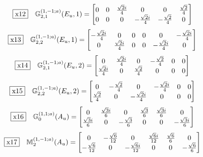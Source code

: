 \documentclass[fleqn,10pt,landscape]{jsarticle}
\begin{document}
\begin{dmath*}
\fbox{x12}\quad \mathbb{G}_{2,1}^{(1,-1;a)}(E_{u},1)=\begin{bmatrix} 0 & 0 & \frac{\sqrt{2} i}{4} & 0 & 0 & \frac{\sqrt{2}}{4} \\ 0 & 0 & 0 & - \frac{\sqrt{2} i}{4} & - \frac{\sqrt{2}}{4} & 0 \end{bmatrix}
\end{dmath*}
\begin{dmath*}
\fbox{x13}\quad \mathbb{G}_{2,2}^{(1,-1;a)}(E_{u},1)=\begin{bmatrix} - \frac{\sqrt{2} i}{4} & 0 & 0 & 0 & 0 & - \frac{\sqrt{2} i}{4} \\ 0 & \frac{\sqrt{2} i}{4} & 0 & 0 & - \frac{\sqrt{2} i}{4} & 0 \end{bmatrix}
\end{dmath*}
\begin{dmath*}
\fbox{x14}\quad \mathbb{G}_{2,1}^{(1,-1;a)}(E_{u},2)=\begin{bmatrix} 0 & \frac{\sqrt{2} i}{4} & 0 & - \frac{\sqrt{2}}{4} & 0 & 0 \\ \frac{\sqrt{2} i}{4} & 0 & \frac{\sqrt{2}}{4} & 0 & 0 & 0 \end{bmatrix}
\end{dmath*}
\begin{dmath*}
\fbox{x15}\quad \mathbb{G}_{2,2}^{(1,-1;a)}(E_{u},2)=\begin{bmatrix} 0 & - \frac{\sqrt{2}}{4} & 0 & - \frac{\sqrt{2} i}{4} & 0 & 0 \\ \frac{\sqrt{2}}{4} & 0 & - \frac{\sqrt{2} i}{4} & 0 & 0 & 0 \end{bmatrix}
\end{dmath*}
\begin{dmath*}
\fbox{x16}\quad \mathbb{G}_{0}^{(1,1;a)}(A_{u})=\begin{bmatrix} 0 & \frac{\sqrt{3} i}{6} & 0 & \frac{\sqrt{3}}{6} & \frac{\sqrt{3} i}{6} & 0 \\ \frac{\sqrt{3} i}{6} & 0 & - \frac{\sqrt{3}}{6} & 0 & 0 & - \frac{\sqrt{3} i}{6} \end{bmatrix}
\end{dmath*}
\begin{dmath*}
\fbox{x17}\quad \mathbb{M}_{2}^{(1,-1;a)}(A_{u})=\begin{bmatrix} 0 & - \frac{\sqrt{6}}{12} & 0 & \frac{\sqrt{6} i}{12} & \frac{\sqrt{6}}{6} & 0 \\ - \frac{\sqrt{6}}{12} & 0 & - \frac{\sqrt{6} i}{12} & 0 & 0 & - \frac{\sqrt{6}}{6} \end{bmatrix}
\end{dmath*}
\end{document}

